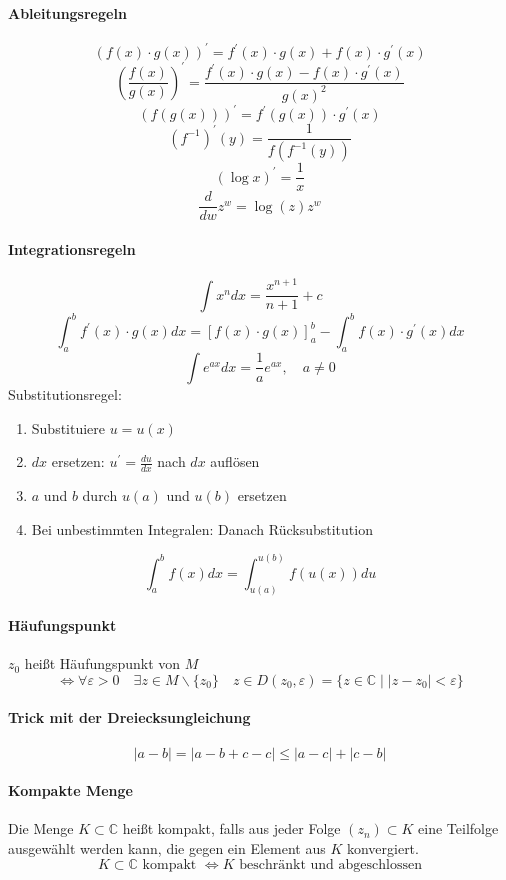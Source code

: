 \documentclass[a4paper, 10pt, DIV20, headings=small]{scrartcl}
\theoremstyle{definition}
\theoremstyle{plain}
\begin{document}
\begin{minipage}{0.5\textwidth}
\paragraph{Ableitungsregeln}
$$\left(f(x) \cdot g(x)\right)^\prime = f^\prime(x) \cdot g(x) + f(x) \cdot g^\prime(x)$$
$$\left(\frac{f(x)}{g(x)}\right)^\prime = \frac{f^\prime(x) \cdot g(x) - f(x) \cdot g^\prime(x)}{g(x)^2}$$
$$\left(f(g(x))\right)^\prime = f^\prime(g(x)) \cdot g^\prime(x)$$
$$(f^{-1})^\prime(y) = \frac{1}{f(f^{-1}(y))}$$
$$(\log x)^\prime = \frac{1}{x}$$
$$\frac{d}{dw} z^w = \log(z) z^w$$
\end{minipage}
\begin{minipage}{0.5\textwidth}
\paragraph{Integrationsregeln}
$$\int x^n dx = \frac{x^{n+1}}{n+1}+c$$
$$\int_a^b f^\prime(x) \cdot g(x) dx = [f(x) \cdot g(x)]_a^b - \int_a^b f(x) \cdot g^\prime(x) dx$$
$$\int e^{ax}dx = \frac{1}{a} e^{ax}, \quad a \neq 0$$
Substitutionsregel:
\begin{enumerate}
\item Substituiere $u = u(x)$
\item $dx$ ersetzen: $u^\prime = \frac{du}{dx}$ nach $dx$ auflösen
\item $a$ und $b$ durch $u(a)$ und $u(b)$ ersetzen
\item Bei unbestimmten Integralen: Danach Rücksubstitution
\end{enumerate}
$$\int_a^b f(x) dx = \int_{u(a)}^{u(b)} f(u(x)) du$$
\end{minipage}

\paragraph{Häufungspunkt}
$z_0$ heißt Häufungspunkt von $M$
$$\Leftrightarrow \forall \varepsilon > 0 \quad \exists z \in M \backslash \{z_0\} \quad z \in D(z_0, \varepsilon) = \{z \in \mathbb{C} \mid |z-z_0| < \varepsilon\}$$

\paragraph{Trick mit der Dreiecksungleichung}
$$|a-b| = |a-b+c-c| \leq |a-c| + |c-b|$$

\paragraph{Kompakte Menge}
Die Menge $K \subset \mathbb{C}$ heißt kompakt, falls aus jeder Folge $(z_n) \subset K$ eine Teilfolge
ausgewählt werden kann, die gegen ein Element aus $K$ konvergiert.
$$K \subset \mathbb{C} \text{ kompakt } \Leftrightarrow K \text{ beschränkt und abgeschlossen}$$
\end{document}
